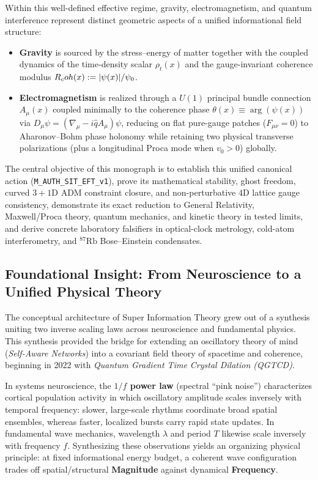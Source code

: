 Within this well-defined effective regime, gravity, electromagnetism, and quantum interference represent distinct geometric aspects of a unified informational field structure:
\begin{itemize}
  \item \textbf{Gravity} is sourced by the stress--energy of matter together with the coupled dynamics of the time-density scalar $\rho_t(x)$ and the gauge-invariant coherence modulus $R_coh(x) := |\psi(x)|/\psi_0$.
  \item \textbf{Electromagnetism} is realized through a $U(1)$ principal bundle connection $A_\mu(x)$ coupled minimally to the coherence phase $\theta(x) \equiv \arg(\psi(x))$ via $D_\mu\psi = (\nabla_\mu - i\hat{q}A_\mu)\psi$, reducing on flat pure-gauge patches ($F_{\mu\nu}=0$) to Aharonov--Bohm phase holonomy while retaining two physical transverse polarizations (plus a longitudinal Proca mode when $v_0 > 0$) globally.
\end{itemize}

The central objective of this monograph is to establish this unified canonical action (\texttt{M\_AUTH\_SIT\_EFT\_v1}), prove its mathematical stability, ghost freedom, curved $3+1$D ADM constraint closure, and non-perturbative 4D lattice gauge consistency, demonstrate its exact reduction to General Relativity, Maxwell/Proca theory, quantum mechanics, and kinetic theory in tested limits, and derive concrete laboratory falsifiers in optical-clock metrology, cold-atom interferometry, and $^{87}\mathrm{Rb}$ Bose--Einstein condensates.

\subsection{Foundational Insight: From Neuroscience to a Unified Physical Theory}

The conceptual architecture of Super Information Theory grew out of a synthesis uniting two inverse scaling laws across neuroscience and fundamental physics. This synthesis provided the bridge for extending an oscillatory theory of mind (\emph{Self-Aware Networks}) into a covariant field theory of spacetime and coherence, beginning in 2022 with \emph{Quantum Gradient Time Crystal Dilation (QGTCD)}.

In systems neuroscience, the \textbf{$1/f$ power law} (spectral ``pink noise'') characterizes cortical population activity in which oscillatory amplitude scales inversely with temporal frequency: slower, large-scale rhythms coordinate broad spatial ensembles, whereas faster, localized bursts carry rapid state updates. In fundamental wave mechanics, wavelength $\lambda$ and period $T$ likewise scale inversely with frequency $f$. Synthesizing these observations yields an organizing physical principle: at fixed informational energy budget, a coherent wave configuration trades off spatial/structural \textbf{Magnitude} against dynamical \textbf{Frequency}.

